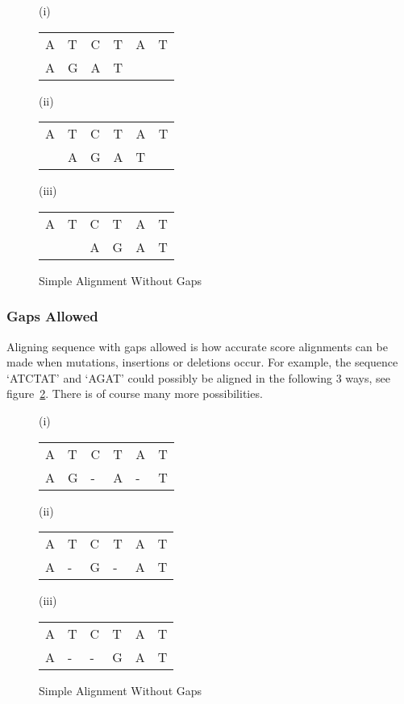 \begin{figure}[h]
    \footnotesize
        (i)
        \begin{tabular}[t]{|llllll|}
            \hline
            A & T & C & T & A & T \\
            A & G & A & T &   &   \\
            \hline
        \end{tabular}
        \hfill
        (ii)
        \begin{tabular}[t]{|llllll|}
            \hline
            A & T & C & T & A & T \\
              & A & G & A & T &   \\
            \hline
        \end{tabular}
        \hfill
        (iii)
        \begin{tabular}[t]{|llllll|}
            \hline
            A & T & C & T & A & T \\
              &   & A & G & A & T \\
            \hline
        \end{tabular}
        \hfill 
\caption{Simple Alignment Without Gaps}
\label{fig:no-gaps}
\end{figure}

\subsubsection{Gaps Allowed}

Aligning sequence with gaps allowed is how accurate score alignments can be made when mutations, insertions or deletions occur. For example, the sequence `ATCTAT' and `AGAT' could possibly be aligned in the following 3 ways, see figure~\ref{fig:gaps}. There is of course many more possibilities.

\begin{figure}[ht]
    \footnotesize
        (i)
        \begin{tabular}[t]{|llllll|}
            \hline
            A & T & C & T & A & T \\
            A & G & - & A & - & T \\
            \hline
        \end{tabular}
        \hfill
        (ii)
        \begin{tabular}[t]{|llllll|}
            \hline
            A & T & C & T & A & T \\
            A & - & G & - & A & T \\
            \hline
        \end{tabular}
        \hfill
        (iii)
        \begin{tabular}[t]{|llllll|}
            \hline
            A & T & C & T & A & T \\
            A & - & - & G & A & T \\
            \hline
        \end{tabular}
        \hfill 
\caption{Simple Alignment Without Gaps}
\label{fig:gaps}
\end{figure}

